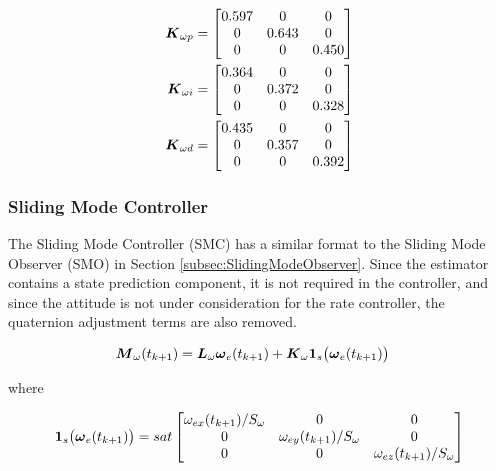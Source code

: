 \begin{subequations}
  \begin{align}
    \boldsymbol{K}_{\omega p} &= \begin{bmatrix} 0.597 & 0 & 0 \\ 0 & 0.643 & 0 \\ 0 & 0 & 0.450 \end{bmatrix} \\
    \boldsymbol{K}_{\omega i} &= \begin{bmatrix} 0.364 & 0 & 0 \\ 0 & 0.372 & 0 \\ 0 & 0 & 0.328 \end{bmatrix} \\
    \boldsymbol{K}_{\omega d} &= \begin{bmatrix} 0.435 & 0 & 0 \\ 0 & 0.357 & 0 \\ 0 & 0 & 0.392 \end{bmatrix}
  \end{align}
  \label{PIDRateControlGains}
\end{subequations}

\subsubsection{Sliding Mode Controller}
\label{subsubsec:SlidingModeController}

The Sliding Mode Controller (SMC) has a similar format to the Sliding Mode Observer (SMO) in Section \ref{subsec:SlidingModeObserver}.  Since the estimator contains a state prediction component, it is not required in the controller, and since the attitude is not under consideration for the rate controller, the quaternion adjustment terms are also removed.

\begin{subequations}
  \begin{align}
    \boldsymbol{M}_{\omega}(t_{k+1}) &= \boldsymbol{L}_{\omega} \boldsymbol{\omega}_e(t_{k+1}) + \boldsymbol{K}_{\omega}\boldsymbol{1}_s \big(\boldsymbol{\omega}_e(t_{k+1}) \big)
  \end{align}
  \label{eqn:SMOControllerwithPredictionUnforcedMotion}
\end{subequations}

where

\begin{equation}
  \boldsymbol{1}_s \big(\boldsymbol{\omega}_e(t_{k+1}) \big) = sat \begin{bmatrix} \omega_{ex}(t_{k+1}) / S_{\omega} &0 &0 \\ 0 & \omega_{ey}(t_{k+1}) / S_{\omega} & 0 \\ 0 & 0 & \omega_{ez}(t_{k+1}) / S_{\omega} \end{bmatrix}
\end{equation}


